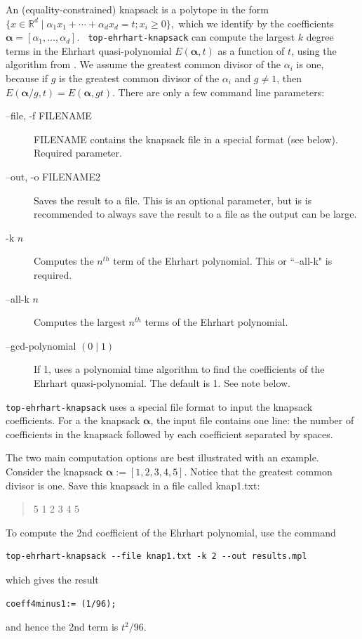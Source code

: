 \documentclass{article}
\newcommand{\R}{{\mathbb R}}
\begin{document}
An (equality-constrained) knapsack is a polytope in the form $\{x \in \R^d \mid \alpha_1 x_1 + \cdots
+ \alpha_d x_d = t; x_i \geq 0\},$ which we identify by the coefficients
$\boldsymbol{\alpha}= [\alpha_1, \dots, \alpha_d].$   {\tt
  top-ehrhart-knapsack} can compute the largest $k$ degree terms in the
Ehrhart quasi-polynomial $E(\boldsymbol{\alpha}, t)$ as a function of $t$,
using the algorithm from
\cite{baldoni-et-al:denumerant-fpsac,baldoni-et-al:denumerant-full-paper}. 
We assume the greatest common divisor of the $\alpha_i$ is one, because if $g$ is the greatest common divisor of the $\alpha_i$ and $g\neq 1$, then $E(\boldsymbol{\alpha}/g, t) = E(\boldsymbol{\alpha}, gt) $. There are only a few command line parameters:

\begin{description}
\item[--file, -f FILENAME] FILENAME contains the knapsack file in a special format (see below). Required parameter.
\item[--out, -o FILENAME2] Saves the result to a file. This is an optional parameter, but is is recommended to always save the result to a file as the output can be large. 
\item[-k $n$] Computes the $n^{th}$ term of the Ehrhart polynomial. This or ``--all-k" is required.
\item[--all-k $n$] Computes the largest $n^{th}$ terms of the Ehrhart polynomial.  
\item[--gcd-polynomial $(0\mid 1)$] If 1, uses a polynomial time algorithm to find the coefficients of the Ehrhart quasi-polynomial. The default is 1. See note below.
\end{description}

{\tt top-ehrhart-knapsack} uses a special file format to input the knapsack coefficients. For a the knapsack $\boldsymbol{\alpha}$, the input file contains one line: the number of coefficients in the knapsack followed by each coefficient separated by spaces.

The two main computation options are best illustrated with an example. Consider the knapsack $\boldsymbol{\alpha}:=[1,2,3,4,5]$. Notice that the greatest common divisor  is one.  Save this knapsack in a file called knap1.txt:
\begin{verse}
5 1 2 3 4 5
\end{verse}

To compute the 2nd coefficient of the Ehrhart polynomial,  use the command
\begin{verbatim}
top-ehrhart-knapsack --file knap1.txt -k 2 --out results.mpl
\end{verbatim}
which gives the result
\begin{verbatim}
coeff4minus1:= (1/96);
\end{verbatim}
and hence the 2nd term is $t^2/96$.
\end{document}
